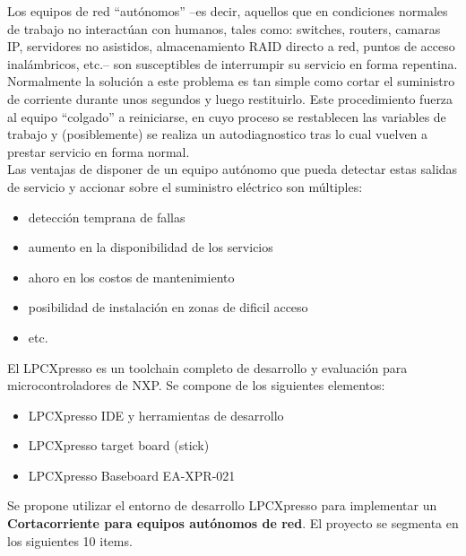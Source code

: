 \documentclass[a4paper,12pt]{article}
\begin{document}
Los equipos de red ``autónomos'' --es decir, aquellos que en condiciones normales de trabajo no interactúan con humanos, tales como: switches, routers, camaras IP, servidores no asistidos, almacenamiento RAID directo a red, puntos de acceso inalámbricos, etc.-- son susceptibles de interrumpir su servicio en forma repentina. Normalmente la solución a este problema es tan simple como cortar el suministro de corriente durante unos segundos y luego restituirlo. Este procedimiento fuerza al equipo ``colgado'' a reiniciarse, en cuyo proceso se restablecen las variables de trabajo y (posiblemente) se realiza un autodiagnostico tras lo cual vuelven a prestar servicio en forma normal.\\

Las ventajas de disponer de un equipo autónomo que pueda detectar estas salidas de servicio y accionar sobre el suministro eléctrico son múltiples:

\begin{itemize}
\item detección temprana de fallas
\item aumento en la disponibilidad de los servicios
\item ahoro en los costos de mantenimiento 
\item posibilidad de instalación en zonas de dificil acceso
\item etc.
\end{itemize}

El LPCXpresso es un toolchain completo de desarrollo y evaluación para microcontroladores de NXP.
Se compone de los siguientes elementos:
\begin{itemize}
\item LPCXpresso IDE y herramientas de desarrollo
\item LPCXpresso target board (stick)
\item LPCXpresso Baseboard EA-XPR-021
\end{itemize}

Se propone utilizar el entorno de desarrollo LPCXpresso para implementar un {\textbf{Cortacorriente para equipos autónomos de red}}.  El proyecto se segmenta en los siguientes 10 items.
\end{document}
